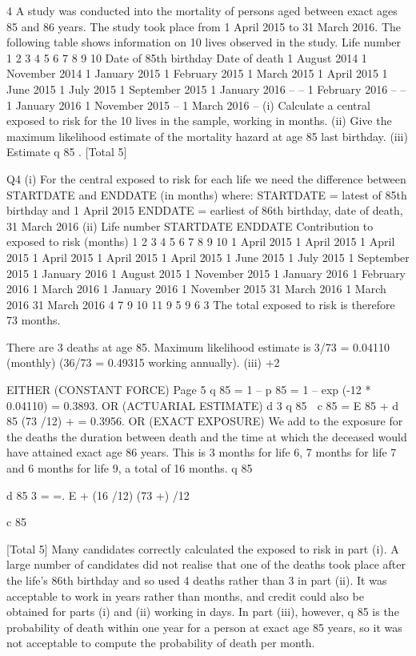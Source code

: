 \documentclass[a4paper,12pt]{article}
\begin{document}
4
A study was conducted into the mortality of persons aged between exact ages 85 and
86 years. The study took place from 1 April 2015 to 31 March 2016. The following
table shows information on 10 lives observed in the study.
Life number
1
2
3
4
5
6
7
8
9
10
Date of 85th birthday Date of death
1 August 2014
1 November 2014
1 January 2015
1 February 2015
1 March 2015
1 April 2015
1 June 2015
1 July 2015
1 September 2015
1 January 2016 –
–
1 February 2016
–
–
1 January 2016
1 November 2015
–
1 March 2016
–
(i) Calculate a central exposed to risk for the 10 lives in the sample, working in
months.
(ii) Give the maximum likelihood estimate of the mortality hazard at age 85 last
birthday.
(iii)
 Estimate q 85 .
[Total 5]



Q4
(i)
For the central exposed to risk for each life we need the difference between
STARTDATE and ENDDATE (in months) where:
STARTDATE = latest of 85th birthday and 1 April 2015
ENDDATE = earliest of 86th birthday, date of death, 31 March 2016
(ii)
Life number STARTDATE ENDDATE Contribution to
exposed to risk
(months)
1
2
3
4
5
6
7
8
9
10 1 April 2015
1 April 2015
1 April 2015
1 April 2015
1 April 2015
1 April 2015
1 June 2015
1 July 2015
1 September 2015
1 January 2016 1 August 2015
1 November 2015
1 January 2016
1 February 2016
1 March 2016
1 January 2016
1 November 2015
31 March 2016
1 March 2016
31 March 2016 4
7
9
10
11
9
5
9
6
3
The total exposed to risk is therefore 73 months. %

There are 3 deaths at age 85. 
Maximum likelihood estimate is 3/73 = 0.04110 (monthly)
(36/73 = 0.49315 working annually).
(iii)
+2


EITHER (CONSTANT FORCE)
Page 5%
q 85 = 1 – p 85 = 1 – exp (-12 * 0.04110) 
= 0.3893. 
OR (ACTUARIAL ESTIMATE)
d
3
q 85  c 85
\;=\;
E 85 \;+ d 85 (73 /12) \;+ 
= 0.3956. 
OR (EXACT EXPOSURE)
We add to the exposure for the deaths the duration between death and
the time at which the deceased would have attained exact age 86 years.
This is 3 months for life 6, 7 months for life 7 and 6 months for life 9,
a total of 16 months.
q 85 

d 85
3
\;=\;
\;=.
E \;+\; (16 /12) (73 \;+) /12

c
85

[Total 5]
Many candidates correctly calculated the exposed to risk in part (i). A
large number of candidates did not realise that one of the deaths took
place after the life’s 86th birthday and so used 4 deaths rather than 3
in part (ii). It was acceptable to work in years rather than months, and
credit could also be obtained for parts (i) and (ii) working in days. In
part (iii), however, q 85 is the probability of death within one year for a
person at exact age 85 years, so it was not acceptable to compute the
probability of death per month.


\end{document}
